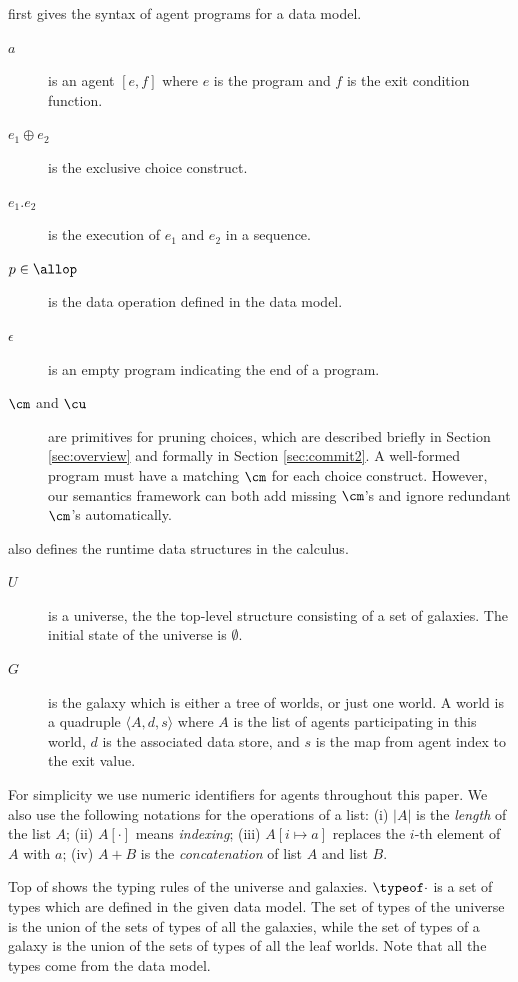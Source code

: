  first gives the syntax of agent programs 
for a data model.
\begin{description}
\item[$a$] is an agent $[e,f]$ where $e$ is the program and
	$f$ is the exit condition function.
\item[$e_1\oplus e_2$] is the exclusive choice construct.
\item[$e_1.e_2$] is the execution of $e_1$ and $e_2$ in a sequence.
\item[$p\in\allop$] is the data operation defined in the data model.
\item[$\epsilon$] is an empty program indicating the end of a program.
\item[$\cm$ and $\cu$] are primitives for pruning choices, which are described briefly in Section \ref{sec:overview} and formally in Section \ref{sec:commit2}. A well-formed program must have a matching $\cm$ for each choice construct.
However, our semantics framework can both add missing $\cm$'s and ignore redundant $\cm$'s automatically.
\end{description}

 also defines the runtime data structures 
in the calculus.
\begin{description}
\item[$U$] is a universe, the the top-level structure consisting of a set of galaxies.
The initial state of the universe is $\emptyset$.
\item[$G$] is the galaxy which is either a tree of worlds, or just one world.
A world is a quadruple $\langle A, d, s\rangle$ where $A$
is the list of agents participating in this world,
$d$ is the associated data store,
and $s$ is the map from agent index to the exit value.
\end{description}

For simplicity we use numeric identifiers for agents throughout this paper.
We also use the following notations for the operations of a list:
(i) $|A|$ is the \emph{length} of the list $A$;
(ii) $A[\cdot]$ means \emph{indexing};
(iii) $A[i\mapsto a]$ replaces the $i$-th element of $A$ with $a$;
(iv) $A+B$ is the \emph{concatenation} of list $A$ and list $B$.

Top of  shows the typing rules of the universe and galaxies.
$\typeof\cdot$ is a set of types which are defined in the given data model.
The set of types of the universe is the union of the sets of types of all the galaxies, 
while the set of types of a galaxy is the union of the sets of types of all the leaf worlds. 
Note that all the types come from the data model.

